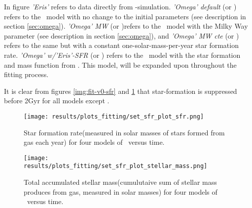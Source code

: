 In figure \textit{'Eris'} refers to data directly from \eris-simulation. \textit{'Omega' default} (or \vanillaomega) refers to the \omegamodel\ model with no change to the initial parameters (see description in section \ref{sec:omega}). \textit{'Omega' MW} (or \mwomega)refers to the \omegamodel\ model with the Milky Way parameter (see description in section \ref{sec:omega}), and \textit{'Omega' MW cte} (or \mwcomega) refers to the same but with a constant one-solar-mass-per-year star formation rate. \textit{'Omega' w/'Eris'-SFR} (or \fiduccialomega) refers to the \omegamodel\ model with the star formation and mass function from \eris. This model, \fiduccialomega will be expanded upon throughout the fitting process.

It is clear from figures \ref{img:fit-v0-sfr} and \ref{img:fit-v0-stellarmass} that star-formation is suppressed before 2Gyr for all models except \vanillaomega.

\begin{figure}[h]
  \begin{minipage}[t][][t]{0.44\textwidth}
    \centering
    \texttt{[image: results/plots\_fitting/set\_sfr\_plot\_sfr.png]}
    \caption[Star formation rate in \omegamodel\ for \insertion-fitting]{\label{img:fit-v0-sfr}
      Star formation rate(measured in solar masses of stars formed from gas each year) for four models of \omegamodel\ versus time. 
    }
  \end{minipage}
  \hfill
  \begin{minipage}[t][][t]{0.4\textwidth}
    \centering
    \texttt{[image: results/plots\_fitting/set\_sfr\_plot\_stellar\_mass.png]}
    \caption[Stellar mass in \omegamodel\ for \insertion-fitting]{\label{img:fit-v0-stellarmass}
      Total accumulated stellar mass(cumulutaive sum of stellar mass produces from gas, measured in solar masses) for four models of \omegamodel\ versus time.
    }
  \end{minipage}
\end{figure}

